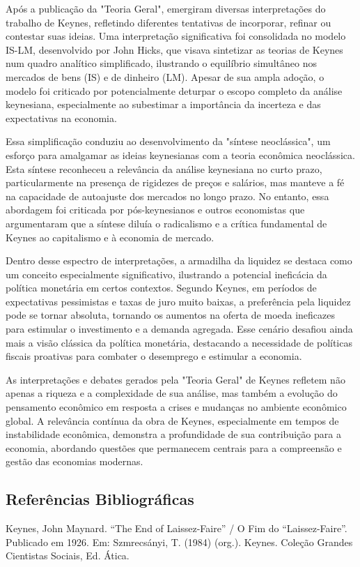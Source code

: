 \documentclass[a4paper,12pt]{article}[abntex2]
\begin{document}
Após a publicação da "Teoria Geral", emergiram diversas interpretações do trabalho de Keynes, refletindo diferentes tentativas de incorporar, refinar ou contestar suas ideias. Uma interpretação significativa foi consolidada no modelo IS-LM, desenvolvido por John Hicks, que visava sintetizar as teorias de Keynes num quadro analítico simplificado, ilustrando o equilíbrio simultâneo nos mercados de bens (IS) e de dinheiro (LM). Apesar de sua ampla adoção, o modelo foi criticado por potencialmente deturpar o escopo completo da análise keynesiana, especialmente ao subestimar a importância da incerteza e das expectativas na economia.

Essa simplificação conduziu ao desenvolvimento da "síntese neoclássica", um esforço para amalgamar as ideias keynesianas com a teoria econômica neoclássica. Esta síntese reconheceu a relevância da análise keynesiana no curto prazo, particularmente na presença de rigidezes de preços e salários, mas manteve a fé na capacidade de autoajuste dos mercados no longo prazo. No entanto, essa abordagem foi criticada por pós-keynesianos e outros economistas que argumentaram que a síntese diluía o radicalismo e a crítica fundamental de Keynes ao capitalismo e à economia de mercado.

Dentro desse espectro de interpretações, a armadilha da liquidez se destaca como um conceito especialmente significativo, ilustrando a potencial ineficácia da política monetária em certos contextos. Segundo Keynes, em períodos de expectativas pessimistas e taxas de juro muito baixas, a preferência pela liquidez pode se tornar absoluta, tornando os aumentos na oferta de moeda ineficazes para estimular o investimento e a demanda agregada. Esse cenário desafiou ainda mais a visão clássica da política monetária, destacando a necessidade de políticas fiscais proativas para combater o desemprego e estimular a economia.

As interpretações e debates gerados pela "Teoria Geral" de Keynes refletem não apenas a riqueza e a complexidade de sua análise, mas também a evolução do pensamento econômico em resposta a crises e mudanças no ambiente econômico global. A relevância contínua da obra de Keynes, especialmente em tempos de instabilidade econômica, demonstra a profundidade de sua contribuição para a economia, abordando questões que permanecem centrais para a compreensão e gestão das economias modernas.

\subsection{\textbf{Referências Bibliográficas}}
Keynes, John Maynard. “The End of Laissez-Faire” / O Fim do “Laissez-Faire”. Publicado em
1926. Em: Szmrecsányi, T. (1984) (org.). Keynes. Coleção Grandes Cientistas Sociais, Ed.
Ática.
\end{document}
